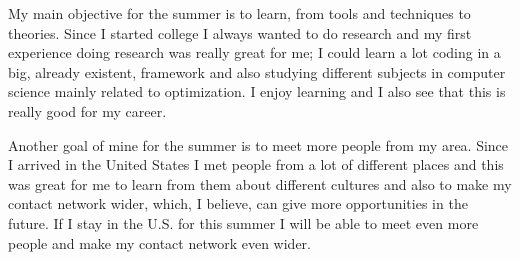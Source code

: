 \documentclass[11pt, a4paper]{awesome-cv}
\begin{document}
\begin{cvletter}
\par My main objective for the summer is to learn, from tools and techniques to theories. Since I started college I always wanted to do research and my first experience doing research was really great for me; I could learn a lot coding in a big, already existent, framework and also studying different subjects in computer science mainly related to optimization. I enjoy learning and I also see that this is really good for my career. 
\par Another goal of mine for the summer is to meet more people from my area. Since I arrived in the United States I met people from a lot of different places and this was great for me to learn from them about different cultures and also to make my contact network wider, which, I believe, can give more opportunities in the future. If I stay in the U.S. for this summer I will be able to meet even more people and make my contact network even wider.

\end{cvletter}


\end{document}
